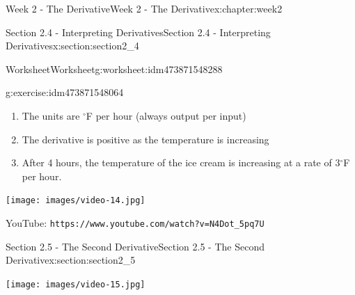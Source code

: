 \documentclass[oneside,10pt,]{book}
\newcommand{\mono}[1]{\texttt{#1}}
\numberwithin{equation}{section}
\newlength{\qrsize}
\newlength{\previewwidth}
\begin{document}
\begin{chapterptx}{Week 2 - The Derivative}{}{Week 2 - The Derivative}{}{}{x:chapter:week2}
\begin{sectionptx}{Section 2.4 - Interpreting Derivatives}{}{Section 2.4 - Interpreting Derivatives}{}{}{x:section:section2_4}
\begin{worksheet-subsection}{Worksheet}{}{Worksheet}{}{}{g:worksheet:idm473871548288}
\begin{divisionexercise}{1}{}{}{g:exercise:idm473871548064}
\begin{enumerate}[label=(\alph*)]
\begin{image}{0}{1}{0}
\end{image}%
%
\item{}The units are \(^\circ\)F per hour (always output per input)%
\item{}The derivative is positive as the temperature is increasing%
\item{}After 4 hours, the temperature of the ice cream is increasing at a rate of 3\(^\circ\)F per hour.%
\end{enumerate}
\end{divisionexercise}%
\end{worksheet-subsection}
\restoregeometry
\setlength{\qrsize}{9em}
\setlength{\previewwidth}{\linewidth}
\addtolength{\previewwidth}{-\qrsize}
\begin{tcbraster}[raster columns=2, raster column skip=1pt, raster halign=center, raster force size=false, raster left skip=0pt, raster right skip=0pt]%
\begin{tcolorbox}[previewstyle, width=\previewwidth]%
\texttt{[image: images/video-14.jpg]}%
\end{tcolorbox}%
\begin{tcolorbox}[qrstyle]%
{\hypersetup{urlcolor=black}}%
\end{tcolorbox}%
\begin{tcolorbox}[captionstyle]%
\small YouTube: \mono{https://www.youtube.com/watch?v=N4Dot\_5pq7U}\end{tcolorbox}%
\end{tcbraster}%
\end{sectionptx}
%
%
\typeout{************************************************}
\typeout{************************************************}
%
\begin{sectionptx}{Section 2.5 - The Second Derivative}{}{Section 2.5 - The Second Derivative}{}{}{x:section:section2_5}
\setlength{\qrsize}{9em}
\setlength{\previewwidth}{\linewidth}
\addtolength{\previewwidth}{-\qrsize}
\begin{tcbraster}[raster columns=2, raster column skip=1pt, raster halign=center, raster force size=false, raster left skip=0pt, raster right skip=0pt]%
\begin{tcolorbox}[previewstyle, width=\previewwidth]%
\texttt{[image: images/video-15.jpg]}%
\end{tcolorbox}%
\begin{tcolorbox}[qrstyle]%
{\hypersetup{urlcolor=black}}%

\end{tcolorbox}
\end{tcbraster}
\end{sectionptx}
\end{chapterptx}
\end{document}
